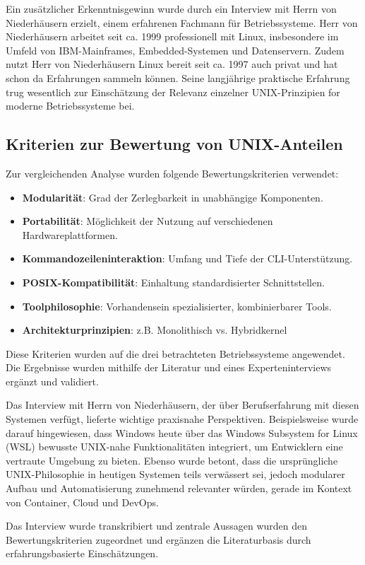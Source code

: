 Ein zusätzlicher Erkenntnisgewinn wurde durch ein Interview mit Herrn von Niederhäusern erzielt, einem erfahrenen Fachmann für Betriebssysteme. Herr von
Niederhäusern arbeitet seit ca. 1999 professionell mit Linux, insbesondere im Umfeld von IBM-Mainframes, Embedded-Systemen und Datenservern. Zudem nutzt Herr von
Niederhäusern Linux bereit seit ca. 1997 auch privat und hat schon da Erfahrungen sammeln können. Seine langjährige praktische Erfahrung trug wesentlich zur
Einschätzung der Relevanz einzelner UNIX-Prinzipien for moderne Betriebssysteme bei.


\subsection{Kriterien zur Bewertung von UNIX-Anteilen}

Zur vergleichenden Analyse wurden folgende Bewertungskriterien verwendet:

\begin{itemize}
	\setlength{\itemsep}{0pt}
	\item \textbf{Modularität}: Grad der Zerlegbarkeit in unabhängige Komponenten.
	\item \textbf{Portabilität}: Möglichkeit der Nutzung auf verschiedenen Hardwareplattformen.
	\item \textbf{Kommandozeileninteraktion}: Umfang und Tiefe der CLI-Unterstützung.
	\item \textbf{POSIX-Kompatibilität}: Einhaltung standardisierter Schnittstellen.
	\item \textbf{Toolphilosophie}: Vorhandensein spezialisierter, kombinierbarer Tools.
	\item \textbf{Architekturprinzipien}: z.B. Monolithisch vs. Hybridkernel
\end{itemize}

Diese Kriterien wurden auf die drei betrachteten Betriebssysteme angewendet. Die Ergebnisse wurden mithilfe der Literatur und eines Experteninterviews ergänzt und
validiert.

\newpage
Das Interview mit Herrn von Niederhäusern, der über Berufserfahrung mit diesen Systemen verfügt, lieferte wichtige praxisnahe Perspektiven. Beispielsweise wurde
darauf hingewiesen, dass Windows heute über das Windows Subsystem for Linux (WSL) bewusste UNIX-nahe Funktionalitäten integriert, um Entwicklern eine vertraute
Umgebung zu bieten. Ebenso wurde betont, dass die ursprüngliche UNIX-Philosophie in heutigen Systemen teils verwässert sei, jedoch modularer Aufbau und
Automatisierung zunehmend relevanter würden, gerade im Kontext von Container, Cloud und DevOps. \cite{interviewNH}

Das Interview wurde transkribiert und zentrale Aussagen wurden den Bewertungskriterien zugeordnet und ergänzen die Literaturbasis durch erfahrungsbasierte
Einschätzungen.
